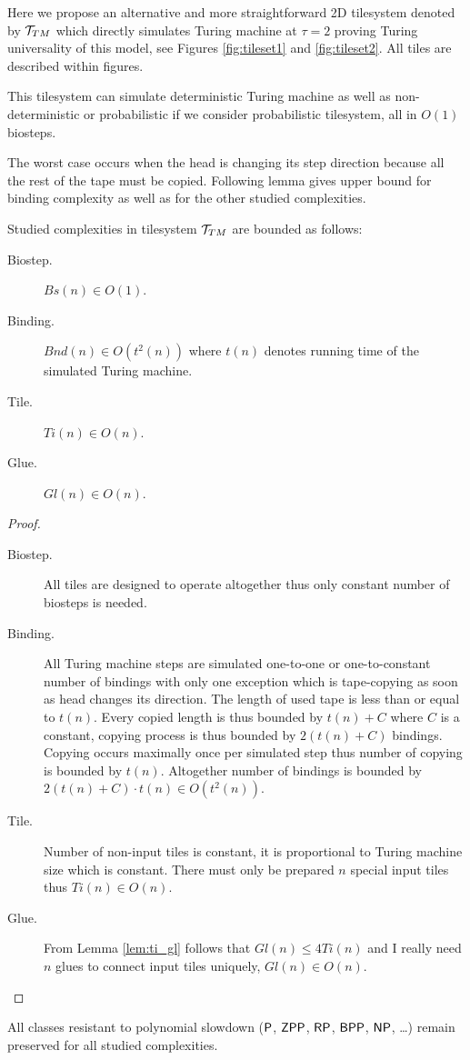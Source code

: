 	Here we propose an alternative and more straightforward 2D tilesystem denoted by ${\cal T}_{TM}$ which directly simulates Turing machine at $\tau=2$ proving Turing universality of this model, see Figures \ref{fig:tileset1} and \ref{fig:tileset2}. All tiles are described within figures.
	\begin{remark}
		This tilesystem can simulate deterministic Turing machine as well as non-deter\-ministic or probabilistic if we consider probabilistic tilesystem, all in $O(1)$ biosteps.
	\end{remark}
	The worst case occurs when the head is changing its step direction because all the rest of the tape must be copied. Following lemma gives upper bound for binding complexity as well as for the other studied complexities.
	\begin{lemma}
	\label{lem:TM_bound}
		Studied complexities in tilesystem ${\cal T}_{TM}$ are bounded as follows:
		\begin{description}
			\item[Biostep.] $Bs(n) \in O(1)$.
			\item[Binding.] $Bnd(n) \in O(t^2(n))$ where $t(n)$ denotes running time of the simulated Turing machine.
			\item[Tile.] $Ti(n) \in O(n)$.
			\item[Glue.] $Gl(n) \in O(n)$.
		\end{description}
	\end{lemma}
	\begin{proof}
		~
		\begin{description}
			\item[Biostep.] All tiles are designed to operate altogether thus only constant number of biosteps is needed.
			\item[Binding.] All Turing machine steps are simulated one-to-one or one-to-constant number of bindings with only one exception which is tape-copying as soon as head changes its direction. The length of %
			used tape is less than or equal to $t(n)$. Every copied length is thus bounded by $t(n) + C$ where $C$ is a constant, copying process is thus bounded by $2(t(n)+C)$ bindings. Copying occurs maximally once per simulated step thus number of copying is bounded by $t(n)$. Altogether number of bindings is bounded by $2(t(n)+C)\cdot t(n) \in O(t^2(n))$.
			\item[Tile.] Number of non-input tiles is constant, it is proportional to Turing machine size which is constant. There must only be prepared $n$ special input tiles thus $Ti(n) \in O(n)$.
			\item[Glue.] From Lemma \ref{lem:ti_gl} follows that $Gl(n) \leq 4Ti(n)$ and I really need $n$ glues to connect input tiles uniquely, $Gl(n)\in O(n)$.
		\end{description}
	\end{proof}
	\begin{cor}
	\label{cor:poly_resist}
		All classes resistant to polynomial slowdown ($\P$, $\ZPP$, $\RP$, $\BPP$, $\NP$, \ldots) remain preserved for all studied complexities.
	\end{cor}
	
